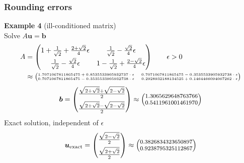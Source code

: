 \documentclass{beamer}
\begin{document}
\begin{frame}
\frametitle{Rounding errors}
\textbf{Example 4} (ill-conditioned matrix)\\[1ex]
Solve $A\boldsymbol{u}=\boldsymbol{b}$
$$
\begin{aligned}
A &= \begin{pmatrix}
1+\frac{1}{\sqrt{2}} + \frac{2+\sqrt{2}}{4}\epsilon & \frac{1}{\sqrt{2}}-\frac{\sqrt{2}}{4}\epsilon\\[1ex]
\frac{1}{\sqrt{2}}-\frac{\sqrt{2}}{4}\epsilon & 1-\frac{1}{\sqrt{2}}+\frac{2-\sqrt{2}}{4}\epsilon
\end{pmatrix}\qquad\text{$\epsilon>0$}
\\
&\approx
{\tiny%
\begin{pmatrix}
1.7071067811865475 + 0.8535533905932737 \cdot\epsilon & 0.7071067811865475 - 0.3535533905932738 \cdot\epsilon \\
0.7071067811865475 - 0.3535533905932738 \cdot\epsilon & 0.2928932188134525 + 0.1464466094067262\cdot\epsilon
\end{pmatrix}}
\end{aligned}
$$
$$
\boldsymbol{b} = \begin{pmatrix}
\frac{\sqrt{2+\sqrt{2}}+\sqrt{2-\sqrt{2}}}{2}\\[1ex]
\frac{\sqrt{2+\sqrt{2}}-\sqrt{2-\sqrt{2}}}{2}
\end{pmatrix}
\approx
{\footnotesize%
\begin{pmatrix}
1.3065629648763766\\0.5411961001461970
\end{pmatrix}}
$$
Exact solution, independent of $\epsilon$
$$
\boldsymbol{u}_{\text{exact}} = 
\begin{pmatrix}
\frac{\sqrt{2 - \sqrt{2}}}{2}\\[1ex]
\frac{\sqrt{2 + \sqrt{2}}}{2}
\end{pmatrix}
\approx 
{\footnotesize%
\begin{pmatrix}
0.3826834323650897\\0.9238795325112867
\end{pmatrix}}
$$
\end{frame}

\end{document}
